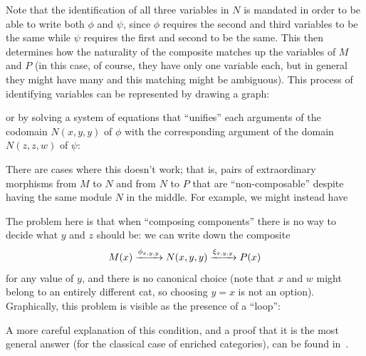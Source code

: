 \documentclass{amsart}
\newcommand{\A}{\cA}
\newcommand{\B}{\cB}
\def\mtoo#1{\xRightarrow[#1]{}}
\begin{document}
Note that the identification of all three variables in $N$ is mandated in order to be able to write both $\phi$ and $\psi$, since $\phi$ requires the second and third variables to be the same while $\psi$ requires the first and second to be the same.
This then determines how the naturality of the composite matches up the variables of $M$ and $P$ (in this case, of course, they have only one variable each, but in general they might have many and this matching might be ambiguous).
This process of identifying variables can be represented by drawing a graph:
\begin{center}
\end{center}
or by solving a system of equations that ``unifies'' each arguments of the codomain $N(x,y,y)$ of $\phi$ with the corresponding argument of the domain $N(z,z,w)$ of $\psi$:

There are cases where this doesn't work; that is, pairs of extraordinary morphisms from $M$ to $N$ and from $N$ to $P$ that are ``non-composable'' despite having the same module $N$ in the middle.
For example, we might instead have
The problem here is that when ``composing components'' there is no way to decide what $y$ and $z$ should be: we can write down the composite
\[ M(x) \xrightarrow{\phi_{x,y,y}} N(x,y,y) \xrightarrow{\xi_{x,y,y}} P(x) \]
for any value of $y$, and there is no canonical choice (note that $x$ and $w$ might belong to an entirely different cat, so choosing $y=x$ is not an option).
Graphically, this problem is visible as the presence of a ``loop'':
\begin{center}
\end{center}
A more careful explanation of this condition, and a proof that it is the most general answer (for the classical case of enriched categories), can be found in~\cite{ek:gen-funct-calc}.
\end{document}
